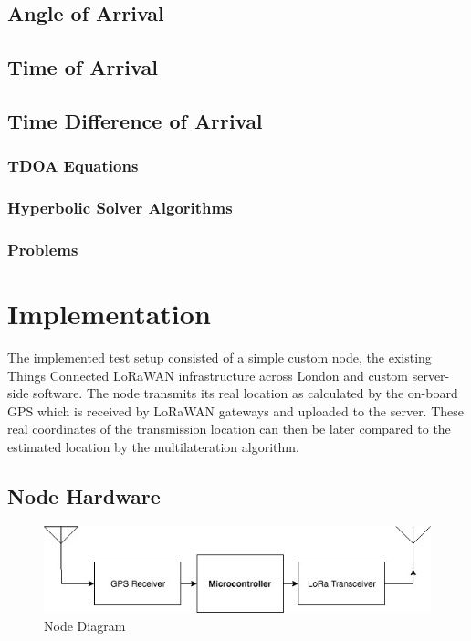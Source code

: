 \documentclass[a4paper]{report}
\begin{document}
  \section{Angle of Arrival}

  \section{Time of Arrival}

  \section{Time Difference of Arrival}
    \subsection{TDOA Equations}
    \subsection{Hyperbolic Solver Algorithms}
    \subsection{Problems}

\chapter{Implementation}

  The implemented test setup consisted of a simple custom node, the existing Things Connected LoRaWAN infrastructure across London and custom server-side software. The node transmits its real location as calculated by the on-board GPS which is received by LoRaWAN gateways and uploaded to the server. These real coordinates of the transmission location can then be later compared to the estimated location by the multilateration algorithm.


  \section{Node Hardware}

    \begin{figure}
    \centering
    \includegraphics[width=12cm]{figures/node.jpeg}
    \caption{Node Diagram}
    \label{fig:node}
    \end{figure}
\end{document}
